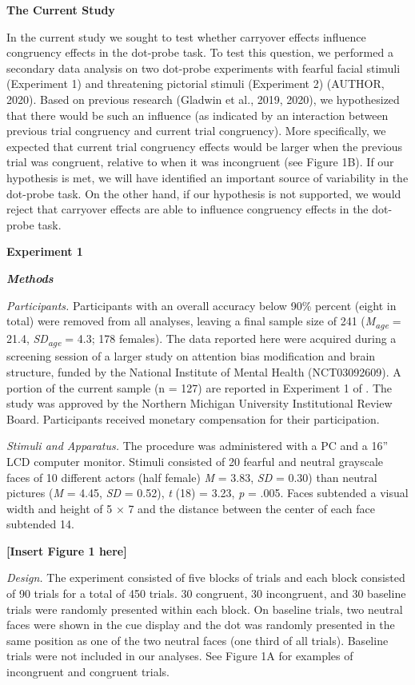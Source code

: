 \documentclass{article}
\begin{document}
\textbf{The Current Study}

In the current study we sought to test whether carryover effects influence congruency effects in the dot-probe task. To test this question, we performed a secondary data analysis on two dot-probe experiments with fearful facial stimuli (Experiment 1) and threatening pictorial stimuli (Experiment 2) (AUTHOR, 2020). Based on previous research (Gladwin et al., 2019, 2020), we hypothesized that there would be such an influence (as indicated by an interaction between previous trial congruency and current trial congruency). More specifically, we expected that current trial congruency effects would be larger when the previous trial was congruent, relative to when it was incongruent (see Figure 1B). If our hypothesis is met, we will have identified an important source of variability in the dot-probe task. On the other hand, if our hypothesis is not supported, we would reject that carryover effects are able to influence congruency effects in the dot-probe task.

\textbf{Experiment 1}

\emph{\textbf{Methods}}

\emph{Participants. }Participants with an overall accuracy below 90\% percent (eight in total) were removed from all analyses, leaving a final sample size of 241 (\emph{M}\textsubscript{\emph{age}} = 21.4, \emph{SD}\textsubscript{\emph{age}} = 4.3; 178 females). The data reported here were acquired during a screening session of a larger study on attention bias modification and brain structure, funded by the National Institute of Mental Health (NCT03092609). A portion of the current sample (n = 127) are reported in Experiment 1 of \parencite{Carlson2020}. The study was approved by the Northern Michigan University Institutional Review Board. Participants received monetary compensation for their participation.

\emph{Stimuli and Apparatus. }The procedure was administered with a PC and a 16” LCD computer monitor. Stimuli consisted of 20 fearful and neutral grayscale faces of 10 different actors (half female) \parencite{Gur2002}\parencite{Lundqvist1998}\emph{M} = 3.83, \emph{SD} = 0.30) than neutral pictures (\emph{M} = 4.45, \emph{SD} = 0.52), \emph{t} (18) = 3.23, \emph{p} = .005. Faces subtended a visual width and height of 5 × 7 and the distance between the center of each face subtended 14.

\textbf{[Insert Figure 1 here]}

\emph{Design. }The experiment consisted of five blocks of trials and each block consisted of 90 trials for a total of 450 trials. 30 congruent, 30 incongruent, and 30 baseline trials were randomly presented within each block. On baseline trials, two neutral faces were shown in the cue display and the dot was randomly presented in the same position as one of the two neutral faces (one third of all trials). Baseline trials were not included in our analyses. See Figure 1A for examples of incongruent and congruent trials.
\end{document}
